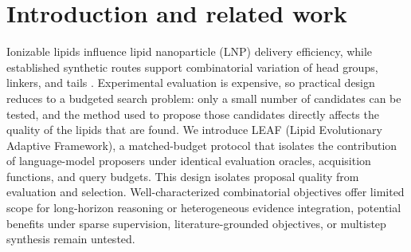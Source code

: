 \documentclass[11pt]{article}
\begin{document}
\section{Introduction and related work}
\label{sec:introduction}
Ionizable lipids influence lipid nanoparticle (LNP) delivery efficiency, while established synthetic routes support combinatorial variation of head groups, linkers, and tails \citep{xu2023ugi}. Experimental evaluation is expensive, so practical design reduces to a budgeted search problem: only a small number of candidates can be tested, and the method used to propose those candidates directly affects the quality of the lipids that are found. We introduce LEAF (Lipid Evolutionary Adaptive Framework), a matched-budget protocol that isolates the contribution of language-model proposers under identical evaluation oracles, acquisition functions, and query budgets. This design isolates proposal quality from evaluation and selection. Well-characterized combinatorial objectives offer limited scope for long-horizon reasoning or heterogeneous evidence integration, potential benefits under sparse supervision, literature-grounded objectives, or multistep synthesis remain untested.
\end{document}
